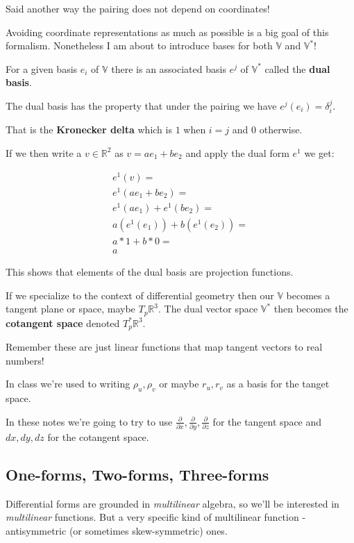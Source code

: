 \documentclass{article}
\begin{document}
Said another way the pairing does not depend on coordinates!

Avoiding coordinate representations as much as possible is a big goal of this
formalism. Nonetheless I am about to introduce bases for both $\mathbb{V}$ and $\mathbb{V}^{*}$!

For a given basis $e_{i}$ of $\mathbb{V}$ there is an associated basis $e^{j}$
of $\mathbb{V}^{*}$ called the \textbf{dual basis}.

The dual basis has the property that under the pairing we have $e^{j}(e_{i}) = \delta^{j}_{i}$.

That is the \textbf{Kronecker delta} which is $1$ when $i = j$ and $0$
otherwise.

If we then write a $v \in \mathbb{R}^{2}$ as $v = ae_{1} + be_{2}$ and apply the
dual form $e^{1}$ we get:

\begin{align*}
  e^{1} (v) = \\
  e^{1}(ae_{1} + be_{2}) = \\
  e^{1}(ae_{1}) + e^{1}(be_{2}) = \\
  a(e^{1}(e_{1})) + b(e^{1}(e_{2})) = \\
  a * 1 + b * 0 = \\
  a
\end{align*}

This shows that elements of the dual basis are projection functions.

If we specialize to the context of differential geometry then our $\mathbb{V}$
becomes a tangent plane or space, maybe $T_{p}\mathbb{R}^{3}$. The dual vector space $\mathbb{V}^{*}$ then becomes the \textbf{cotangent space}
denoted $T_{p}^{*}\mathbb{R}^{3}$.

Remember these are just linear functions that
map tangent vectors to real numbers!

In class we're used to writing $\rho_{u}, \rho_{v}$ or maybe $r_{u}, r_{v}$ as a
basis for the tanget space.

In these notes we're going to try to use $\frac{\partial}{\partial x}, \frac{\partial}{\partial
  y}, \frac{\partial}{\partial z}$ for the tangent space and $dx, dy, dz$ for the cotangent space.

\subsection{One-forms, Two-forms, Three-forms}

Differential forms are grounded in \textit{multilinear} algebra, so we'll be
interested in \textit{multilinear} functions. But a very specific kind of
multilinear function - antisymmetric (or sometimes skew-symmetric) ones.
\end{document}
